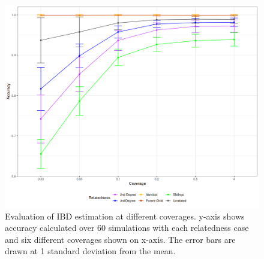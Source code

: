 \documentclass[12pt, letterpaper]{article}
\begin{document}
\begin{figure}[h!]
    \includegraphics[width=16cm]{plots/plotimg/plot_IBDaccuracy.png}
    \centering
    \caption{Evaluation of IBD estimation at different coverages. y-axis shows accuracy calculated over 60 simulations with each relatedness case and six different coverages shown on x-axis. The error bars are drawn at 1 standard deviation from the mean.}
    \label{fig4:Comparison_READ_KIN}
\end{figure}
\end{document}
